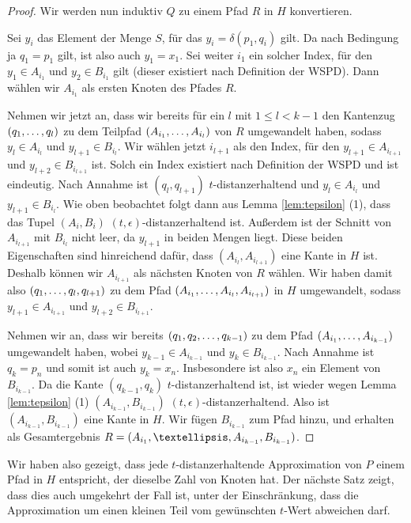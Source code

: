 	\begin{proof}
		Wir werden nun induktiv $Q$ zu einem Pfad $R$ in $H$ konvertieren.
		
		Sei $y_i$ das Element der Menge $S$, für das $y_i = \delta(p_1, q_i)$ gilt. Da nach Bedingung ja $q_1 = p_1$ gilt, ist also auch $y_1 = x_1$.
		Sei weiter $i_1$ ein solcher Index, für den $y_1 \in A_{i_1}$ und $y_2 \in B_{i_1}$ gilt (dieser existiert nach Definition der WSPD).
		Dann wählen wir $A_{i_1}$ als ersten Knoten des Pfades $R$.
		
		Nehmen wir jetzt an, dass wir bereits für ein $l$ mit $1 \leq l < k-1$ den Kantenzug $(q_1, \mathellipsis, q_l)$ zu dem Teilpfad $(A_{i_1}, \mathellipsis, A_{i_l})$ von $R$ umgewandelt haben, sodass $y_l \in A_{i_l}$ und $y_{l+1} \in B_{i_l}$. 
		Wir wählen jetzt $i_{l+1}$ als den Index, für den $y_{l+1} \in A_{i_{l+1}}$ und $y_{l+2} \in B_{i_{l+1}}$ ist. 
		Solch ein Index existiert nach Definition der WSPD und ist eindeutig. 
		Nach Annahme ist $(q_l, q_{l+1})$ $t$-distanzerhaltend und $y_l \in A_{i_l}$ und $y_{l+1} \in B_{i_l} $. 
		Wie oben beobachtet folgt dann aus Lemma \ref{lem:tepsilon} (1), dass das Tupel $(A_i, B_i)$ $(t, \epsilon)$-distanzerhaltend ist. 
		Außerdem ist der Schnitt von $A_{i_{l+1}}$ mit $B_{i_l}$ nicht leer, da $y_{l+1}$ in beiden Mengen liegt. 
		Diese beiden Eigenschaften sind hinreichend dafür, dass $(A_{i_l}, A_{i_{l+1}})$ eine Kante in $H$ ist. Deshalb können wir $A_{i_{l+1}}$ als nächsten Knoten von $R$ wählen.
		Wir haben damit also $(q_1, \mathellipsis, q_l, q_{l+1})$ zu dem Pfad $(A_{i_1}, \mathellipsis, A_{i_l}, A_{i_{l+1}})$ in $H$ umgewandelt, sodass $y_{l+1} \in A_{i_{l+1}}$ und $y_{l+2} \in B_{i_{l+1}}$.
		
		Nehmen wir an, dass wir bereits $(q_1, q_2, \mathellipsis, q_{k-1})$ zu dem Pfad $(A_{i_1}, \mathellipsis, A_{i_{k-1}})$ umgewandelt haben, wobei $y_{k-1} \in A_{i_{k-1}}$ und $y_k \in B_{i_{k-1}}$. 
		Nach Annahme ist $q_k = p_n$ und somit ist auch $y_k = x_n$. 
		Insbesondere ist also $x_n$ ein Element von $B_{i_{k-1}}$.
		Da die Kante $(q_{k-1}, q_k)$ $t$-distanzerhaltend ist, ist wieder wegen Lemma \ref{lem:tepsilon} (1) $(A_{i_{k-1}}, B_{i_{k-1}})$ $(t, \epsilon)$-distanzerhaltend. 
		Also ist $(A_{i_{k-1}}, B_{i_{k-1}})$ eine Kante in $H$. 
		Wir fügen $B_{i_{k-1}}$ zum Pfad hinzu, und erhalten als Gesamtergebnis $R = (A_{i_1}, \textellipsis, A_{i_{k-1}}, B_{i_{k-1}})$.
	\end{proof}
	
	Wir haben also gezeigt, dass jede $t$-distanzerhaltende Approximation von $P$ einem Pfad in $H$ entspricht, der dieselbe Zahl von Knoten hat. Der nächste Satz zeigt, dass dies auch umgekehrt der Fall ist, unter der Einschränkung, dass die Approximation um einen kleinen Teil vom gewünschten $t$-Wert abweichen darf.
	

